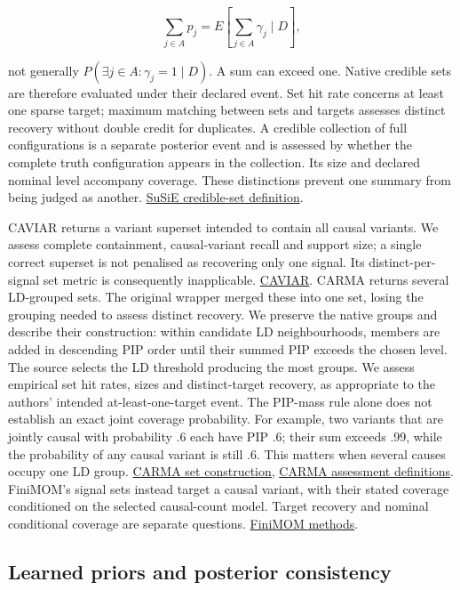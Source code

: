 \documentclass[
  british,
  10pt,
]{article}
\begin{document}
\[\sum_{j\in A}p_j=E\!\left[\sum_{j\in A}\gamma_j\mid D\right],\]

not generally \(P(\exists j\in A:\gamma_j=1\mid D)\). A sum can exceed
one. Native credible sets are therefore evaluated under their declared
event. Set hit rate concerns at least one sparse target; maximum
matching between sets and targets assesses distinct recovery without
double credit for duplicates. A credible collection of full
configurations is a separate posterior event and is assessed by whether
the complete truth configuration appears in the collection. Its size and
declared nominal level accompany coverage. These distinctions prevent
one summary from being judged as another.
\href{https://doi.org/10.1111/rssb.12388}{SuSiE credible-set
definition}.

CAVIAR returns a variant superset intended to contain all causal
variants. We assess complete containment, causal-variant recall and
support size; a single correct superset is not penalised as recovering
only one signal. Its distinct-per-signal set metric is consequently
inapplicable.
\href{https://pmc.ncbi.nlm.nih.gov/articles/PMC4196608/}{CAVIAR}. CARMA
returns several LD-grouped sets. The original wrapper merged these into
one set, losing the grouping needed to assess distinct recovery. We
preserve the native groups and describe their construction: within
candidate LD neighbourhoods, members are added in descending PIP order
until their summed PIP exceeds the chosen level. The source selects the
LD threshold producing the most groups. We assess empirical set hit
rates, sizes and distinct-target recovery, as appropriate to the
authors' intended at-least-one-target event. The PIP-mass rule alone
does not establish an exact joint coverage probability. For example, two
variants that are jointly causal with probability .6 each have PIP .6;
their sum exceeds .99, while the probability of any causal variant is
still .6. This matters when several causes occupy one LD group.
\href{https://github.com/ZikunY/CARMA/blob/51f0fcf6a74ee74c75fd2ce70912fdd6cdd214fe/R/CARMA.R\#L146-L200}{CARMA
set construction},
\href{https://www.nature.com/articles/s41588-023-01392-0}{CARMA
assessment definitions}. FiniMOM's signal sets instead target a causal
variant, with their stated coverage conditioned on the selected
causal-count model. Target recovery and nominal conditional coverage are
separate questions.
\href{https://oulurepo.oulu.fi/bitstream/handle/10024/45769/nbnfi-fe20230908121884.pdf?isAllowed=y&sequence=1}{FiniMOM
methods}.

\subsection{Learned priors and posterior
consistency}\label{learned-priors-and-posterior-consistency}
\end{document}

